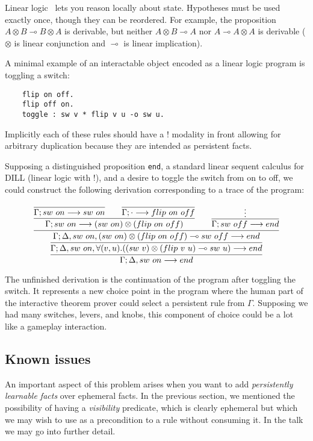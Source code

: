 \newcommand{\lolli}{\multimap}

Linear logic~\cite{Girard87} lets you reason locally about state. Hypotheses must be used
exactly once, though they can be reordered. For example, the proposition $A
\otimes B \lolli B \otimes A$ is derivable, but neither $A \otimes B \lolli
A$ nor $A \lolli A \otimes A$ is derivable ($\otimes$ is linear
conjunction and $\lolli$ is linear implication).

A minimal example of an interactable object encoded as a linear logic
program is toggling a switch:

\begin{verbatim}
    flip on off.
    flip off on.
    toggle : sw v * flip v u -o sw u.
\end{verbatim}

Implicitly each of these rules should have a $!$ modality in front allowing
for arbitrary duplication because they are intended as persistent facts.

Supposing a distinguished proposition \verb|end|, a standard linear sequent
calculus for DILL (linear logic with $!$), and a desire to toggle the
switch from on to off, we could construct the following derivation
corresponding to a trace of the program:

{\small
\[
\infer
{
  \Gamma; \Delta, sw\ on \longrightarrow end
}
{
  \infer
  {
    \Gamma; \Delta, sw\ on, \forall(v,u).((sw\ v)\otimes (flip\ v\
    u)\multimap sw\ u)
    \longrightarrow end
  }
  {
  \infer
    {
    \Gamma; \Delta, sw\ on, (sw\ on)\otimes (flip\ on\ off)\multimap sw\
    off
    \longrightarrow end
    }
    {
        \infer{
          \Gamma; sw\ on \longrightarrow (sw\ on)\otimes(flip\ on\ off)
          }
          {
            \infer
            {\Gamma; sw\ on \longrightarrow sw\ on}
            {}
            \qquad
            \infer
            {\Gamma; \cdot \longrightarrow flip\ on\ off}
            {}
          }
        \qquad
        \infer{
          \Gamma; sw\ off \longrightarrow end
          }
          {\vdots
          }
    }
  }
}
\]
}

The unfinished derivation is the continuation of the program after toggling
the switch. It represents a new choice point in the program where the human
part of the interactive theorem prover could select a persistent rule from
$\Gamma$.  Supposing we had many switches, levers, and knobs, this
component of choice could be a lot like a gameplay interaction.



 \subsection{Known issues}
 
 An important aspect of this problem arises when you want to add {\em
 persistently learnable facts} over ephemeral facts. In the previous
 section, we mentioned the possibility of having a {\em visibility}
 predicate, which is clearly ephemeral but which we may wish to use as a
 precondition to a rule without consuming it. In the talk we may go into
 further detail.
